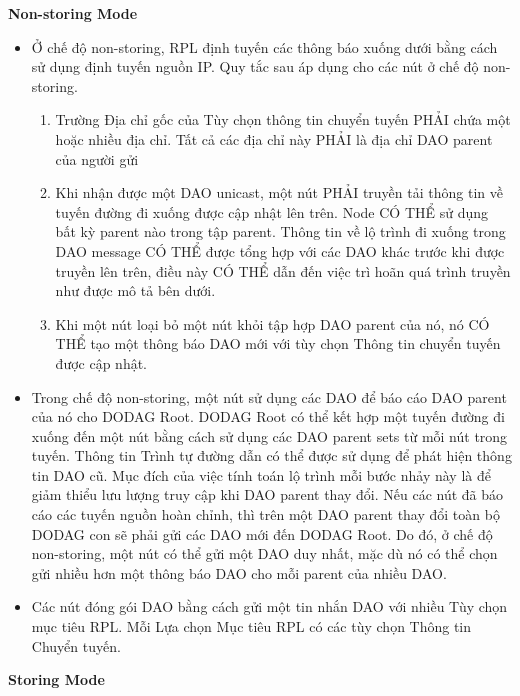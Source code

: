 \documentclass{report}
\begin{document}
\textbf{Non-storing Mode}
\begin{itemize}
	\item Ở chế độ non-storing, RPL định tuyến các thông báo xuống dưới bằng cách sử dụng định tuyến nguồn IP. Quy tắc sau áp dụng cho các nút ở chế độ non-storing.
	\begin{enumerate}
		\item Trường Địa chỉ gốc của Tùy chọn thông tin chuyển tuyến PHẢI chứa một hoặc nhiều địa chỉ. Tất cả các địa chỉ này PHẢI là địa chỉ DAO parent của người gửi
		\item Khi nhận được một DAO unicast, một nút PHẢI truyền tải thông tin về tuyến đường đi xuống được cập nhật lên trên. Node CÓ THỂ sử dụng bất kỳ parent nào trong tập parent. Thông tin về lộ trình đi xuống trong DAO message CÓ THỂ được tổng hợp với các DAO khác trước khi được truyền lên trên, điều này CÓ THỂ dẫn đến việc trì hoãn quá trình truyền như được mô tả bên dưới.
		\item Khi một nút loại bỏ một nút khỏi tập hợp DAO parent của nó, nó CÓ THỂ tạo một thông báo DAO mới với tùy chọn Thông tin chuyển tuyến được cập nhật.
	\end{enumerate}
	\item Trong chế độ non-storing, một nút sử dụng các DAO để báo cáo DAO parent của nó cho DODAG Root. DODAG Root có thể kết hợp một tuyến đường đi xuống đến một nút bằng cách sử dụng các DAO parent sets từ mỗi nút trong tuyến. Thông tin Trình tự đường dẫn có thể được sử dụng để phát hiện thông tin DAO cũ. Mục đích của việc tính toán lộ trình mỗi bước nhảy này là để giảm thiểu lưu lượng truy cập khi DAO parent thay đổi. Nếu các nút đã báo cáo các tuyến nguồn hoàn chỉnh, thì trên một DAO parent thay đổi toàn bộ DODAG con sẽ phải gửi các DAO mới đến DODAG Root. Do đó, ở chế độ non-storing, một nút có thể gửi một DAO duy nhất, mặc dù nó có thể chọn gửi nhiều hơn một thông báo DAO cho mỗi parent của nhiều DAO.
	\item Các nút đóng gói DAO bằng cách gửi một tin nhắn DAO với nhiều Tùy chọn mục tiêu RPL. Mỗi Lựa chọn Mục tiêu RPL có các tùy chọn Thông tin Chuyển tuyến.
\end{itemize}
\textbf{Storing Mode}
\end{document}
